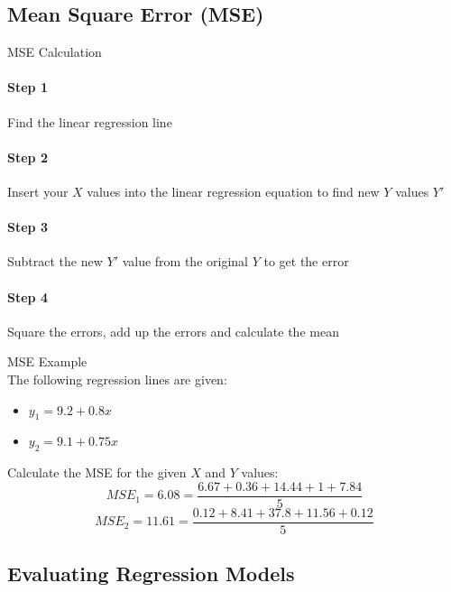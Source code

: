 \subsection{Mean Square Error (MSE)}

\begin{KR}{MSE Calculation}\\
\paragraph{Step 1}
Find the linear regression line

\paragraph{Step 2}
Insert your $X$ values into the linear regression equation to find new $Y$ values $Y'$

\paragraph{Step 3}
Subtract the new $Y'$ value from the original $Y$ to get the error

\paragraph{Step 4}
Square the errors, add up the errors and calculate the mean
\end{KR}

\begin{example2}{MSE Example}\\
The following regression lines are given:
\begin{itemize}
    \item $y_1 = 9.2 + 0.8x$
    \item $y_2 = 9.1 + 0.75x$
\end{itemize}

Calculate the MSE for the given $X$ and $Y$ values:
$$MSE_1 = 6.08 = \frac{6.67 + 0.36 + 14.44 + 1 + 7.84}{5}$$
$$MSE_2 = 11.61 = \frac{0.12 + 8.41 + 37.8 + 11.56 + 0.12}{5}$$
\end{example2}


\subsection{Evaluating Regression Models}

